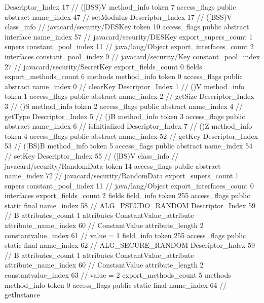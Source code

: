 {{{{{					Descriptor_Index	17		// ([BSS)V
				}
				method_info {
					token	7
					access_flags	public abstract
					name_index	47		// setModulus
					Descriptor_Index	17		// ([BSS)V
				}
			}
		}
		class_info {		// javacard/security/DESKey
			token	10
			access_flags	public abstract interface
			name_index	57		// javacard/security/DESKey
			export_supers_count	1
			supers {
				constant_pool_index	11		// java/lang/Object
			}
			export_interfaces_count	2
			interfaces {
				constant_pool_index	9		// javacard/security/Key
				constant_pool_index	27		// javacard/security/SecretKey
			}
			export_fields_count	0
			fields {
			}
			export_methods_count	6
			methods {
				method_info {
					token	0
					access_flags	public abstract
					name_index	0		// clearKey
					Descriptor_Index	1		// ()V
				}
				method_info {
					token	1
					access_flags	public abstract
					name_index	2		// getSize
					Descriptor_Index	3		// ()S
				}
				method_info {
					token	2
					access_flags	public abstract
					name_index	4		// getType
					Descriptor_Index	5		// ()B
				}
				method_info {
					token	3
					access_flags	public abstract
					name_index	6		// isInitialized
					Descriptor_Index	7		// ()Z
				}
				method_info {
					token	4
					access_flags	public abstract
					name_index	52		// getKey
					Descriptor_Index	53		// ([BS)B
				}
				method_info {
					token	5
					access_flags	public abstract
					name_index	54		// setKey
					Descriptor_Index	55		// ([BS)V
				}
			}
		}
		class_info {		// javacard/security/RandomData
			token	14
			access_flags	public abstract
			name_index	72		// javacard/security/RandomData
			export_supers_count	1
			supers {
				constant_pool_index	11		// java/lang/Object
			}
			export_interfaces_count	0
			interfaces {
			}
			export_fields_count	2
			fields {
			field_info {
				token	255
				access_flags	public static final
				name_index	58		// ALG_PSEUDO_RANDOM
				Descriptor_Index	59		// B
				attributes_count	1
				attributes {
				ConstantValue_attribute {
					attribute_name_index	60		// ConstantValue
					attribute_length	2
					constantvalue_index	61		// value = 1
				}
				}
			}
			field_info {
				token	255
				access_flags	public static final
				name_index	62		// ALG_SECURE_RANDOM
				Descriptor_Index	59		// B
				attributes_count	1
				attributes {
				ConstantValue_attribute {
					attribute_name_index	60		// ConstantValue
					attribute_length	2
					constantvalue_index	63		// value = 2
				}
				}
			}
			}
			export_methods_count	5
			methods {
				method_info {
					token	0
					access_flags	public static final
					name_index	64		// getInstance
}}}}}
